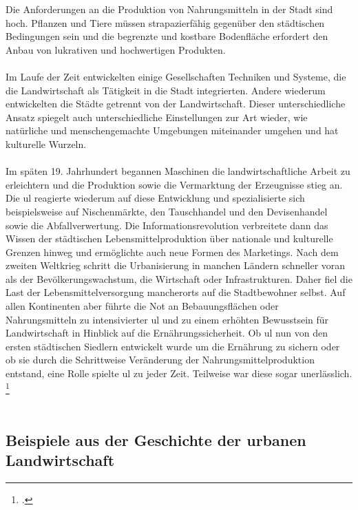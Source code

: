 \documentclass{scrartcl}
\begin{document}
Die Anforderungen an die Produktion von Nahrungsmitteln in der Stadt sind hoch. Pflanzen und Tiere müssen strapazierfähig gegenüber den städtischen Bedingungen sein und die begrenzte und kostbare Bodenfläche erfordert den Anbau von lukrativen und hochwertigen Produkten.\\ 
\\
Im Laufe der Zeit entwickelten einige Gesellschaften Techniken und Systeme, die die Landwirtschaft als Tätigkeit in die Stadt integrierten. Andere wiederum entwickelten die Städte getrennt von der Landwirtschaft. Dieser unterschiedliche Ansatz spiegelt auch unterschiedliche Einstellungen zur Art wieder, wie natürliche und menschengemachte Umgebungen miteinander umgehen und hat kulturelle Wurzeln.\\
\\
Im späten 19. Jahrhundert begannen Maschinen die landwirtschaftliche Arbeit zu erleichtern und die Produktion sowie die Vermarktung der Erzeugnisse stieg an. Die \acs{ul} reagierte wiederum auf diese Entwicklung und spezialisierte sich beispielsweise auf Nischenmärkte, den Tauschhandel und den Devisenhandel sowie die Abfallverwertung. Die Informationsrevolution verbreitete dann das Wissen der städtischen Lebensmittelproduktion über nationale und kulturelle Grenzen hinweg und ermöglichte auch neue Formen des Marketings. Nach dem zweiten Weltkrieg schritt die Urbanisierung in manchen Ländern schneller voran als der Bevölkerungswachstum, die Wirtschaft oder Infrastrukturen. Daher fiel die Last der Lebensmittelversorgung mancherorts auf die Stadtbewohner selbst. Auf allen Kontinenten aber führte die Not an Bebauungsflächen oder Nahrungsmitteln zu intensivierter \acs{ul} und zu einem erhöhten Bewusstsein für Landwirtschaft in Hinblick auf die Ernährungssicherheit. Ob \acs{ul} nun von den ersten städtischen Siedlern entwickelt wurde um die Ernährung zu sichern oder ob sie durch die Schrittweise Veränderung der Nahrungsmittelproduktion entstand, eine Rolle spielte \acs{ul} zu jeder Zeit. Teilweise war diese sogar unerlässlich.  \footcite[Vgl.][S. 1-4]{Smit2001UrbanCities}\\
\\
\subsection{Beispiele aus der Geschichte der urbanen Landwirtschaft}
\end{document}
